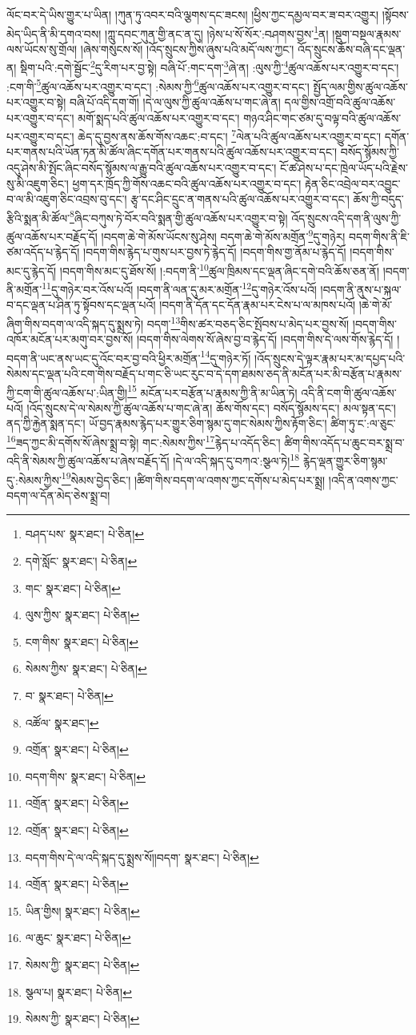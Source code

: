 ལོང་བར་དེ་ཡིས་གྱུར་པ་ཡིན། །ཀུན་ཏུ་འབར་བའི་ལྕགས་དང་ཟངས། །ཕྱིས་ཀྱང་དམྱལ་བར་ཟ་བར་འགྱུར། །སྟོབས་མེད་ཡིད་ནི་མི་དགའ་བས། །ཀླུ་དབང་ཀུན་གྱི་ནང་ན་དུ། །ཉེས་པ་སོ་སོར་:བཤགས་བྱས་\footnote{བཤད་པས་  སྣར་ཐང་།  པེ་ཅིན། }ན། །སྡུག་བསྔལ་རྣམས་ལས་ཡོངས་སུ་གྲོལ། །ཞེས་གསུངས་སོ། །འོད་སྲུངས་ཀྱིས་ཞུས་པའི་མདོ་ལས་ཀྱང་། འོད་སྲུངས་ཆོས་བཞི་དང་ལྡན་ན། སྡིག་པའི་:དགེ་སྦྱོང་\footnote{དགེ་སློང་  སྣར་ཐང་།  པེ་ཅིན། }དུ་རིག་པར་བྱ་སྟེ། བཞི་པོ་:གང་དག་\footnote{གང་  སྣར་ཐང་།  པེ་ཅིན། }ཞེ་ན། :ལུས་ཀྱི་\footnote{ལུས་ཀྱིས་  སྣར་ཐང་།  པེ་ཅིན། }ཚུལ་འཆོས་པར་འགྱུར་བ་དང་། :ངག་གི་\footnote{ངག་གིས་  སྣར་ཐང་།  པེ་ཅིན། }ཚུལ་འཆོས་པར་འགྱུར་བ་དང་། :སེམས་ཀྱི་\footnote{སེམས་ཀྱིས་  སྣར་ཐང་།  པེ་ཅིན། }ཚུལ་འཆོས་པར་འགྱུར་བ་དང་། སྤྱོད་ལམ་གྱིས་ཚུལ་འཆོས་པར་འགྱུར་བ་སྟེ། བཞི་པོ་འདི་དག་གོ། །དེ་ལ་ལུས་ཀྱི་ཚུལ་འཆོས་པ་གང་ཞེ་ན། དལ་གྱིས་འགྲོ་བའི་ཚུལ་འཆོས་པར་འགྱུར་བ་དང་། མགོ་སྨད་པའི་ཚུལ་འཆོས་པར་འགྱུར་བ་དང་། གཉའ་ཤིང་གང་ཙམ་དུ་བལྟ་བའི་ཚུལ་འཆོས་པར་འགྱུར་བ་དང་། ཆེད་དུ་བྱས་ནས་ཆོས་གོས་འཆང་:བ་དང་། \footnote{བ་  སྣར་ཐང་།  པེ་ཅིན། }ལེན་པའི་ཚུལ་འཆོས་པར་འགྱུར་བ་དང་། དགོན་པར་གནས་པའི་ཡོན་ཏན་མི་ཚོལ་ཞིང་དགོན་པར་གནས་པའི་ཚུལ་འཆོས་པར་འགྱུར་བ་དང་། བསོད་སྙོམས་ཀྱི་འདུ་ཤེས་མི་སྤོང་ཞིང་བསོད་སྙོམས་ལ་རྒྱུ་བའི་ཚུལ་འཆོས་པར་འགྱུར་བ་དང་། ངོ་ཚ་ཤེས་པ་དང་ཁྲེལ་ཡོད་པའི་རྗེས་སུ་མི་འཇུག་ཅིང་། ཕྱག་དར་ཁྲོད་ཀྱི་གོས་འཆང་བའི་ཚུལ་འཆོས་པར་འགྱུར་བ་དང་། རྟེན་ཅིང་འབྲེལ་བར་འབྱུང་བ་ལ་མི་འཇུག་ཅིང་འབྲས་བུ་དང་། རྩྭ་དང་ཤིང་དྲུང་ན་གནས་པའི་ཚུལ་འཆོས་པར་འགྱུར་བ་དང་། ཆོས་ཀྱི་བདུད་རྩིའི་སྨན་མི་ཚོལ་\footnote{འཚོལ་  སྣར་ཐང་། }ཞིང་བཀུས་ཏེ་བོར་བའི་སྨན་གྱི་ཚུལ་འཆོས་པར་འགྱུར་བ་སྟེ། འོད་སྲུངས་འདི་དག་ནི་ལུས་ཀྱི་ཚུལ་འཆོས་པར་བརྗོད་དོ། །བདག་ཆེ་གེ་མོས་ཡོངས་སུ་ཤེས། བདག་ཆེ་གེ་མོས་མགྲོན་\footnote{འགྲོན་  སྣར་ཐང་།  པེ་ཅིན། }དུ་གཉེར། བདག་གིས་ནི་ཇི་ཙམ་འདོད་པ་རྙེད་དོ། །བདག་གིས་རྙེད་པ་གུས་པར་བྱས་ཏེ་རྙེད་དོ། །བདག་གིས་གྱ་ནོམ་པ་རྙེད་དོ། །བདག་གིས་མང་དུ་རྙེད་དོ། །བདག་གིས་མང་དུ་ཐོས་སོ། །:བདག་ནི་\footnote{བདག་གིས་  སྣར་ཐང་།  པེ་ཅིན། }ཚུལ་ཁྲིམས་དང་ལྡན་ཞིང་དགེ་བའི་ཆོས་ཅན་ནོ། །བདག་ནི་མགྲོན་\footnote{འགྲོན་  སྣར་ཐང་།  པེ་ཅིན། }དུ་གཉེར་བར་འོས་པའོ། །བདག་ནི་ལན་དུ་མར་མགྲོན་\footnote{འགྲོན་  སྣར་ཐང་།  པེ་ཅིན། }དུ་གཉེར་འོས་པའོ། །བདག་ནི་ནུས་པ་སྐལ་བ་དང་ལྡན་པ་ཤིན་ཏུ་སྟོབས་དང་ལྡན་པའོ། །བདག་ནི་དོན་དང་དོན་རྣམ་པར་ངེས་པ་ལ་མཁས་པའོ། །ཆེ་གེ་མོ་ཞིག་གིས་བདག་ལ་འདི་སྐད་དུ་སྨྲས་ཏེ། བདག་\footnote{བདག་གིས་དེ་ལ་འདི་སྐད་དུ་སྨྲས་སོ།།བདག་  སྣར་ཐང་།  པེ་ཅིན། }གིས་ཚར་བཅད་ཅིང་སྤོབས་པ་མེད་པར་བྱས་སོ། །བདག་གིས་འཁོར་མངོན་པར་མགུ་བར་བྱས་སོ། །བདག་གིས་ལེགས་སོ་ཞེས་བྱ་བ་རྙེད་དོ། །བདག་གིས་དེ་ལས་གོས་རྙེད་དོ། །བདག་ནི་ཡང་ནས་ཡང་དུ་འོང་བར་བྱ་བའི་ཕྱིར་མགྲོན་\footnote{འགྲོན་  སྣར་ཐང་།  པེ་ཅིན། }དུ་གཉེར་ཏོ། །འོད་སྲུངས་དེ་ལྟར་རྣམ་པར་མ་དཔྱད་པའི་སེམས་དང་ལྡན་པའི་ངག་གིས་བརྗོད་པ་གང་ཅི་ཡང་རུང་བ་དེ་དག་ཐམས་ཅད་ནི་མངོན་པར་མི་བརྩོན་པ་རྣམས་ཀྱི་ངག་གི་ཚུལ་འཆོས་པ་:ཡིན་གྱི།\footnote{ཡིན་གྱིས།  སྣར་ཐང་།  པེ་ཅིན། } མངོན་པར་བརྩོན་པ་རྣམས་ཀྱི་ནི་མ་ཡིན་ཏེ། འདི་ནི་ངག་གི་ཚུལ་འཆོས་པའོ། །འོད་སྲུངས་དེ་ལ་སེམས་ཀྱི་ཚུལ་འཆོས་པ་གང་ཞེ་ན། ཆོས་གོས་དང་། བསོད་སྙོམས་དང་། མལ་སྟན་དང་། ནད་ཀྱི་རྐྱེན་སྨན་དང་། ཡོ་བྱད་རྣམས་རྙེད་པར་གྱུར་ཅིག་སྙམ་དུ་གང་སེམས་ཀྱིས་རྟོག་ཅིང་། ཚིག་ཏུ་ང་:ལ་ཅུང་\footnote{ལ་ཆུང་  སྣར་ཐང་།  པེ་ཅིན། }ཟད་ཀྱང་མི་དགོས་སོ་ཞེས་སྨྲ་བ་སྟེ། གང་:སེམས་ཀྱིས་\footnote{སེམས་ཀྱི་  སྣར་ཐང་།  པེ་ཅིན། }རྙེད་པ་འདོད་ཅིང་། ཚིག་གིས་འདོད་པ་ཆུང་བར་སྨྲ་བ་འདི་ནི་སེམས་ཀྱི་ཚུལ་འཆོས་པ་ཞེས་བརྗོད་དོ། །དེ་ལ་འདི་སྐད་དུ་བཀའ་:སྩལ་ཏེ།\footnote{སྩལ་པ།  སྣར་ཐང་།  པེ་ཅིན། } རྙེད་ལྡན་གྱུར་ཅིག་སྙམ་དུ་:སེམས་ཀྱིས་\footnote{སེམས་ཀྱི་  སྣར་ཐང་།  པེ་ཅིན། }སེམས་བྱེད་ཅིང་། །ཚིག་གིས་བདག་ལ་འགས་ཀྱང་དགོས་པ་མེད་པར་སྨྲ། །འདི་ན་འགས་ཀྱང་བདག་ལ་དོན་མེད་ཅེས་སྨྲ་བ། 